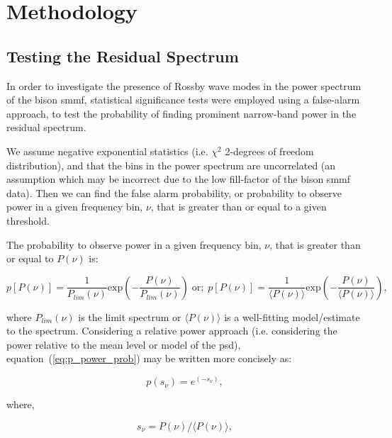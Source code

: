 \section{Methodology}\label{sec:r-mode_method}

\subsection{Testing the Residual Spectrum}
In order to investigate the presence of Rossby wave modes in the power spectrum of the \gls{bison} \gls{smmf}, statistical significance tests were employed using a false-alarm approach, to test the probability of finding prominent narrow-band power in the residual spectrum.

We assume negative exponential statistics (i.e. $\chi^2$ 2-degrees of freedom distribution), and that the bins in the power spectrum are uncorrelated (an assumption which may be incorrect due to the low fill-factor of the \gls{bison} \gls{smmf} data). Then we can find the false alarm probability, or probability to observe power in a given frequency bin, $\nu$, that is greater than or equal to a given threshold.

The probability to observe power in a given frequency bin, $\nu$, that is greater than or equal to $P(\nu)$ is:

\begin{equation}
p[P(\nu)] = \frac{1}{P_{lim}(\nu)} \mathrm{exp}\left(-\frac{P(\nu)}{P_{lim}(\nu)}\right) \; \mathrm{or; } \; p[P(\nu)] = \frac{1}{\langle P(\nu) \rangle} \mathrm{exp}\left(-\frac{P(\nu)}{\langle P(\nu) \rangle}\right),
\label{eq:p_power_prob}
\end{equation}


where $P_{lim}(\nu)$ is the limit spectrum or $\langle P(\nu) \rangle$ is a well-fitting model/estimate to the spectrum. Considering a relative power approach (i.e. considering the power relative to the mean level or model of the \gls{psd}), equation~(\ref{eq:p_power_prob}) may be written more concisely as:

\begin{equation}
p(s_{\nu}) = e^{(-s_{\nu})},
\label{eq:p_power_prob_concise}
\end{equation}

where,

\begin{equation}
s_{\nu} = P(\nu)/\langle P(\nu) \rangle,
\label{eq:s_v}
\end{equation}

